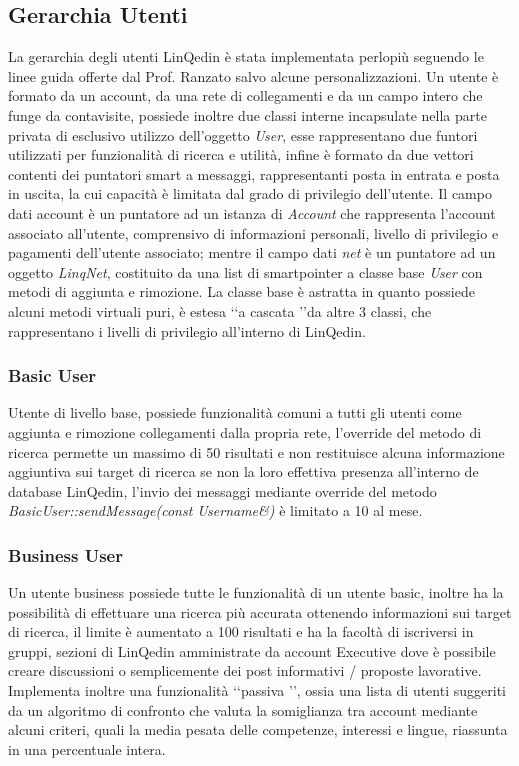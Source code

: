 \subsection*{Gerarchia Utenti}
La gerarchia degli utenti LinQedin è stata implementata perlopiù seguendo le linee guida offerte dal Prof. Ranzato salvo alcune personalizzazioni.
Un utente è formato da un account, da una rete di collegamenti e da un campo intero che funge da contavisite, possiede inoltre due classi interne
incapsulate nella parte privata di esclusivo utilizzo dell'oggetto \textit{User}, esse rappresentano due funtori utilizzati per funzionalità di
ricerca e utilità, infine è formato da due vettori contenti dei puntatori smart a messaggi, rappresentanti posta in entrata e posta in uscita, la cui capacità
è limitata dal grado di privilegio dell'utente.
Il campo dati account è un puntatore ad un istanza di \textit{Account} che rappresenta l'account associato all'utente, comprensivo di informazioni
personali, livello di privilegio e pagamenti dell'utente associato; mentre il campo dati \textit{net} è un puntatore ad un oggetto \textit{LinqNet},
costituito da una list di smartpointer a classe base \textit{User} con metodi di aggiunta e rimozione.
La classe base è astratta in quanto possiede alcuni metodi virtuali puri, è estesa \lq\lq a cascata \rq\rq da altre 3 classi, che rappresentano
i livelli di privilegio all'interno di LinQedin.
\subsubsection*{Basic User}
Utente di livello base, possiede funzionalità comuni a tutti gli utenti come aggiunta e rimozione collegamenti dalla propria rete, l'override del metodo
di ricerca permette un massimo di 50 risultati e non restituisce alcuna informazione aggiuntiva sui target di ricerca se non la loro effettiva
presenza all'interno de database LinQedin, l'invio dei messaggi mediante override del metodo \textit{BasicUser::sendMessage(const Username\&)} è limitato a 10 al mese.
\subsubsection*{Business User}
Un utente business possiede tutte le funzionalità di un utente basic, inoltre ha la possibilità di effettuare una ricerca più accurata ottenendo informazioni sui target di ricerca,
il limite è aumentato a 100 risultati e ha la facoltà di iscriversi in gruppi, sezioni di LinQedin amministrate da account Executive dove è possibile creare discussioni o
semplicemente dei post informativi / proposte lavorative. Implementa inoltre una funzionalità \lq\lq passiva \rq\rq, ossia una lista di utenti suggeriti da un algoritmo di
confronto che valuta la somiglianza tra account mediante alcuni criteri, quali la media pesata delle competenze, interessi e lingue, riassunta in una percentuale intera.
